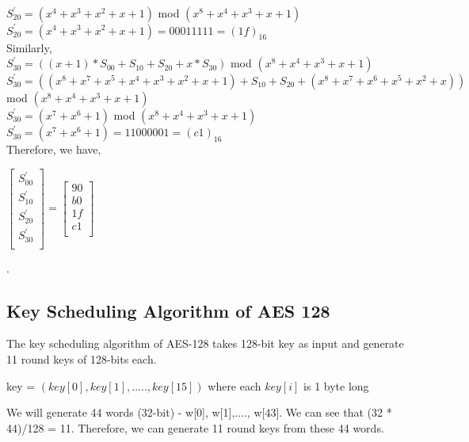 \documentclass[11pt]{article}
\begin{document}
    \newline
    $S_{20}^{'} = (x^4 + x^3 + x^2 + x + 1)$ mod $(x^8 + x^4 + x^3 + x + 1)$\\
    \newline
    $S_{20}^{'} = (x^4 + x^3 + x^2 + x + 1) = 00011111 = (1f)_{16}$\\
    \newline
Similarly,\\
\newline
    $S_{30}^{'} = ((x+1) * S_{00} + S_{10} + S_{20} + x * S_{30})$ mod $(x^8 + x^4 + x^3 + x + 1)$\\
    \newline
    $S_{30}^{'} = ((x^8 + x^7 + x^5 + x^4 + x^3 + x^2 + x + 1) + S_{10} + S_{20} + (x^8 + x^7 + x^6 + x^5 + x^2 + x))$ mod $(x^8 + x^4 + x^3 + x + 1)$\\
    \newline
    $S_{30}^{'} = (x^7 + x^6 + 1)$ mod $(x^8 + x^4 + x^3 + x + 1)$\\
    \newline
    $S_{30}^{'} = (x^7 + x^6 + 1) = 11000001 = (c1)_{16}$\\
\newline
Therefore, we have,
\begin{center}
    $
    \begin{bmatrix}
        S_{00}^{'}\\
        S_{10}^{'}\\
        S_{20}^{'}\\
        S_{30}^{'}\\
    \end{bmatrix}
    =
    \begin{bmatrix}
        90\\
        b0\\
        1f\\
        c1\\
    \end{bmatrix}
    $
\end{center}.

\subsection*{Key Scheduling Algorithm of AES 128}
The key scheduling algorithm of AES-128 takes 128-bit key as input and generate 11 round keys of 128-bits each.
\begin{center}
    key = $(key[0], key[1],....., key[15])$ where each $key[i]$ is 1 byte long
\end{center}
We will generate 44 words (32-bit) - w[0], w[1],...., w[43]. We can see that (32 * 44)/128 = 11. Therefore, we can generate 11 round keys from these 44 words.\\
\end{document}
